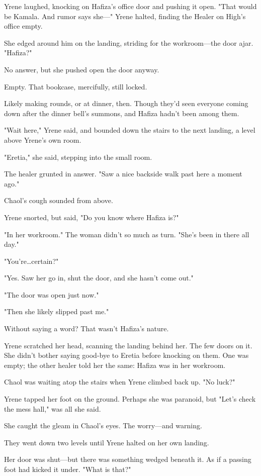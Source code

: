 Yrene laughed, knocking on Hafiza's office door and pushing it open.
"That would be Kamala.
And rumor says she---" Yrene halted, finding the Healer on High's office empty.

She edged around him on the landing, striding for the workroom---the door ajar.
"Hafiza?"

No answer, but she pushed open the door anyway.

Empty.
That bookcase, mercifully, still locked.

Likely making rounds, or at dinner, then.
Though they'd seen everyone coming down after the dinner bell's summons, and Hafiza hadn't been among them.

"Wait here," Yrene said, and bounded down the stairs to the next landing, a level above Yrene's own room.

"Eretia," she said, stepping into the small room.

The healer grunted in answer.
"Saw a nice backside walk past here a moment ago."

Chaol's cough sounded from above.

Yrene snorted, but said, "Do you know where Hafiza is?"

"In her workroom."
The woman didn't so much as turn.
"She's been in there all day."

"You're\ldots certain?"

"Yes.
Saw her go in, shut the door, and she hasn't come out."

"The door was open just now."

"Then she likely slipped past me."

Without saying a word?
That wasn't Hafiza's nature.

Yrene scratched her head, scanning the landing behind her.
The few doors on it.
She didn't bother saying good-bye to Eretia before knocking on them.
One was empty; the other healer told her the same: Hafiza was in her workroom.

Chaol was waiting atop the stairs when Yrene climbed back up.
"No luck?"

Yrene tapped her foot on the ground.
Perhaps she was paranoid, but  "Let's check the mess hall," was all she said.

She caught the gleam in Chaol's eyes.
The worry---and warning.

They went down two levels until Yrene halted on her own landing.

Her door was shut---but there was something wedged beneath it.
As if a passing foot had kicked it under.
"What is that?"

